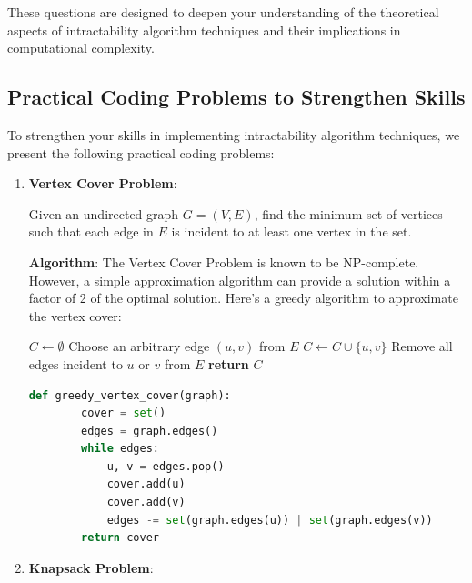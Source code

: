 These questions are designed to deepen your understanding of the theoretical aspects of intractability algorithm techniques and their implications in computational complexity.

\subsection{Practical Coding Problems to Strengthen Skills}

To strengthen your skills in implementing intractability algorithm techniques, we present the following practical coding problems:

\begin{enumerate}
    \item \textbf{Vertex Cover Problem}:
    
    Given an undirected graph $G = (V, E)$, find the minimum set of vertices such that each edge in $E$ is incident to at least one vertex in the set. 
    
    \textbf{Algorithm}:
    The Vertex Cover Problem is known to be NP-complete. However, a simple approximation algorithm can provide a solution within a factor of 2 of the optimal solution. Here's a greedy algorithm to approximate the vertex cover:
    
    \begin{algorithm}[H]
        \caption{Greedy Vertex Cover Approximation}
        \begin{algorithmic}[1]
            \State $C \gets \emptyset$
                \State Choose an arbitrary edge $(u, v)$ from $E$
                \State $C \gets C \cup \{u, v\}$
                \State Remove all edges incident to $u$ or $v$ from $E$
            \EndWhile
            \State \textbf{return} $C$
        \end{algorithmic}
    \end{algorithm}
    
    \FloatBarrier
    
    \begin{lstlisting}[language=Python]
    def greedy_vertex_cover(graph):
        cover = set()
        edges = graph.edges()
        while edges:
            u, v = edges.pop()
            cover.add(u)
            cover.add(v)
            edges -= set(graph.edges(u)) | set(graph.edges(v))
        return cover
    \end{lstlisting}
    
    \item \textbf{Knapsack Problem}:
    

\end{enumerate}
